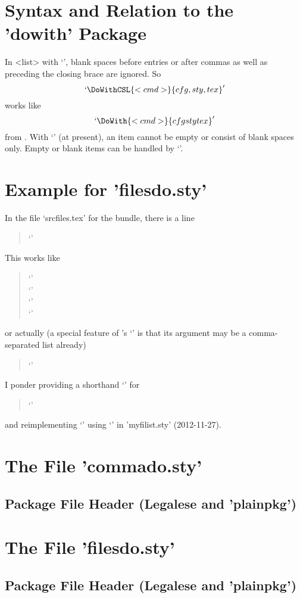 \documentclass{article} %
\begin{document}
\section{Syntax and Relation to the 'dowith' Package}
In <list> with `', blank spaces 
before entries or after commas as well as preceding the 
closing brace are ignored. So 
\[`\DoWithCSL{<cmd>}{ cfg, sty, tex }'\]
works like 
\[`\DoWith{<cmd>}{{cfg}{sty}{tex}}'\]
from . %
With `\DoWithCSL' 
(at present), %
an item cannot be empty or consist of blank spaces only. 
Empty or blank items can be handled by `\DoWith'.

\section{Example for 'filesdo.sty'}
In the file `srcfiles.tex' for the  bundle, 
there is a line 
\begin{quote}
`\DoWithBasesExts{}'\kern-10pt
\end{quote}
This works like 
\begin{quote}
`'\\
`'\\
`'\\
`'
\end{quote}
or actually 
(a special feature of 's
 `\ReadFileInfos' is that its argument may be 
 a comma-separated list already)
\begin{quote}
`'
\end{quote}
I ponder providing a shorthand `\ReadBaseExtInfos' for 
\begin{quote}
`\DoWithBasesExts\ReadFileInfos'
\end{quote}
and reimplementing `\ReadFileInfos' using `\DoWithCLS' in 'myfilist.sty'
(2012-11-27).

\pagebreak
\section{The File 'commado.sty'}
\subsection{Package File Header (Legalese and 'plainpkg')}


\newpage

\section{The File 'filesdo.sty'}
\subsection{Package File Header (Legalese and 'plainpkg')}
\ResetCodeLineNumbers
\renewcommand*{\mdJobName}{filesdo}
\end{document}
